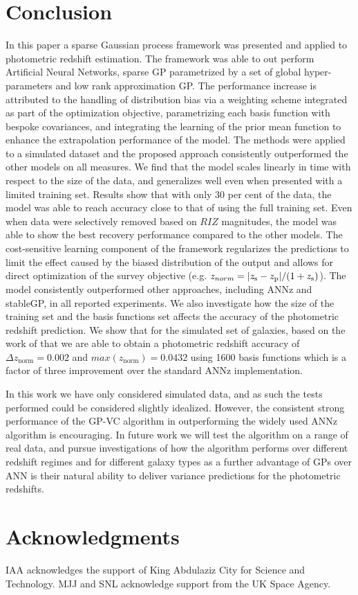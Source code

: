 \documentclass[useAMS,usenatbib,fleqn]{mn2e}
\begin{document}
\section{Conclusion}
\label{sec-conclusion}

In this paper a sparse Gaussian process framework was presented and applied to photometric redshift estimation. The framework was able to out perform Artificial Neural Networks, sparse GP parametrized by a set of global hyper-parameters and low rank approximation GP. The performance increase is attributed to the handling of distribution bias via a weighting scheme integrated as part of the optimization objective, parametrizing each basis function with bespoke covariances, and integrating the learning of the prior mean function to enhance the extrapolation performance of the model. The methods were applied to a simulated dataset and the proposed approach consistently outperformed the other models on all measures. We find that the model scales linearly in time with respect to the size of the data, and generalizes well even when presented with a limited training set. Results show that with only 30 per cent of the data, the model was able to reach accuracy close to that of using the full training set. Even when data were selectively removed based on $RIZ$ magnitudes, the model was able to show the best recovery performance compared to the other models. The cost-sensitive learning component of the framework regularizes the predictions to limit the effect caused by the biased distribution of the output and allows for direct optimization of the survey objective (e.g. $z_{norm} = |z_\textrm{s} - z_\textrm{p}| / (1+z_{\rm s})$). The model consistently outperformed other approaches, including ANNz and stableGP, in all reported experiments. We also investigate how the size of the training set and the basis functions set affects the accuracy of the photometric redshift prediction. We show that for the simulated set of galaxies, based on the work of \cite{jouvel09} that we are able to obtain a photometric redshift accuracy of $\Delta z_\textrm{norm}  = 0.002$ and $max\left(z_\textrm{norm}\right)=0.0432$ using 1600 basis functions which is a factor of three improvement over the standard ANNz implementation.

In this work we have only considered simulated data, and as such the tests performed could be considered slightly idealized. However, the consistent strong performance of the GP-VC algorithm in outperforming the widely used ANNz algorithm is encouraging. In future work we will test the algorithm on a range of real data, and pursue investigations of how the algorithm performs over different redshift regimes and for different galaxy types as a further advantage of GPs over ANN is their natural ability to deliver variance predictions for the photometric redshifts.




\section*{Acknowledgments}
IAA acknowledges the support of King Abdulaziz City for Science and Technology.
MJJ and SNL acknowledge support from the UK Space Agency.
\balance
\footnotesize{


}

\label{lastpage}
\end{document}
